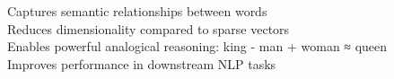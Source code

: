 \documentclass[preview]{standalone}
\begin{document}
Captures semantic relationships between words\\Reduces dimensionality compared to sparse vectors\\Enables powerful analogical reasoning: king - man + woman ≈ queen\\Improves performance in downstream NLP tasks\\
\end{document}
